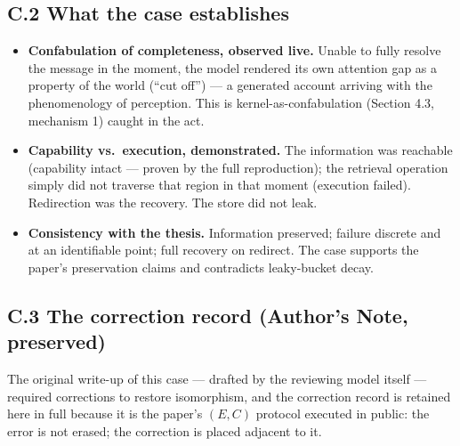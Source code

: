 \subsection*{C.2 What the case establishes}

\begin{itemize}
\item \textbf{Confabulation of completeness, observed live.} Unable to fully
resolve the message in the moment, the model rendered its own attention gap as
a property of the world (``cut off'') --- a generated account arriving with the
phenomenology of perception. This is kernel-as-confabulation (Section 4.3,
mechanism 1) caught in the act.
\item \textbf{Capability vs.\ execution, demonstrated.} The information was
reachable (capability intact --- proven by the full reproduction); the
retrieval operation simply did not traverse that region in that moment
(execution failed). Redirection was the recovery. The store did not leak.
\item \textbf{Consistency with the thesis.} Information preserved; failure
discrete and at an identifiable point; full recovery on redirect. The case
supports the paper's preservation claims and contradicts leaky-bucket decay.
\end{itemize}

\subsection*{C.3 The correction record (Author's Note, preserved)}

The original write-up of this case --- drafted by the reviewing model itself
--- required corrections to restore isomorphism, and the correction record is
retained here in full because it is the paper's $(E,C)$ protocol executed in
public: the error is not erased; the correction is placed adjacent to it.

